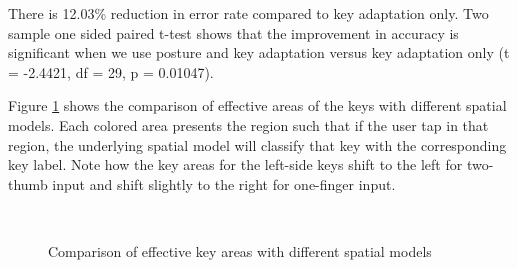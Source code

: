 \documentclass{sigchi}
\begin{document}
There is 12.03\% reduction in error rate compared to key adaptation only. Two
sample one sided paired t-test shows that the improvement in accuracy is
significant when we use posture and key adaptation versus key adaptation only (t = -2.4421, df = 29, p = 0.01047).

Figure \ref{fig:key-boundary} shows the comparison of effective areas of the keys
with different spatial models. Each colored area presents the region such that if the
user tap in that region, the underlying spatial model will classify that key with the 
corresponding key label. Note how the key areas for the left-side keys shift to the left
for two-thumb input and shift slightly to the right for one-finger input.

\begin{figure}[tb]
	\centering
	 ~
	\caption{Comparison of effective key areas with different spatial models}
	\label{fig:key-boundary}
\end{figure}
\end{document}
